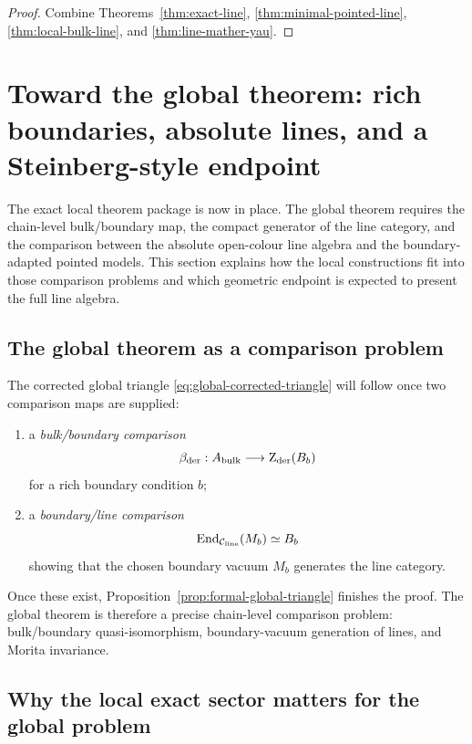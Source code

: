 \begin{proof}
Combine Theorems~\ref{thm:exact-line}, \ref{thm:minimal-pointed-line}, \ref{thm:local-bulk-line}, and \ref{thm:line-mather-yau}.
\end{proof}


\section{Toward the global theorem: rich boundaries, absolute lines, and a Steinberg-style endpoint}%

The exact local theorem package is now in place. The global theorem
requires the chain-level bulk/boundary map, the compact generator of
the line category, and the comparison between the absolute open-colour
line algebra and the boundary-adapted pointed models. This section
explains how the local constructions fit into those comparison
problems and which geometric endpoint is expected to present the full line
algebra.

\subsection{The global theorem as a comparison problem}

The corrected global triangle \eqref{eq:global-corrected-triangle} will follow once two comparison maps are supplied:

\begin{enumerate}[label=(\arabic*),leftmargin=1.8em]
\item a \emph{bulk/boundary comparison}
\[
\beta_{\mathrm{der}}:A_{\mathrm{bulk}}\longrightarrow \operatorname{Z}_{\mathrm{der}}(B_b)
\]
for a rich boundary condition $b$;
\item a \emph{boundary/line comparison}
\[
\operatorname{End}_{\mathcal C_{\mathrm{line}}}(M_b)\simeq B_b
\]
showing that the chosen boundary vacuum $M_b$ generates the line category.
\end{enumerate}

Once these exist, Proposition~\ref{prop:formal-global-triangle}
finishes the proof. The global theorem is therefore a precise
chain-level comparison problem: bulk/boundary quasi-isomorphism,
boundary-vacuum generation of lines, and Morita invariance.

\subsection{Why the local exact sector matters for the global problem}

